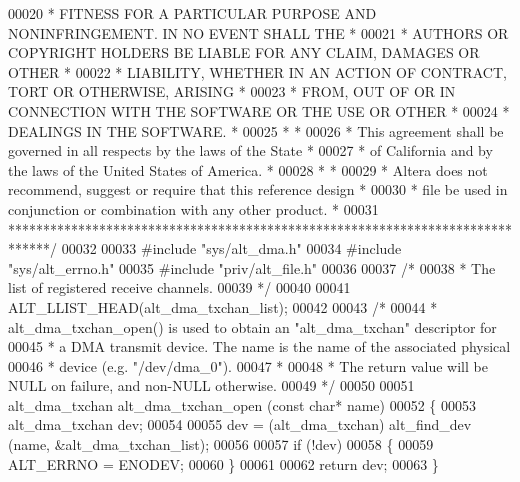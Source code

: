 \begin{DoxyCode}
00020 \textcolor{comment}{* FITNESS FOR A PARTICULAR PURPOSE AND NONINFRINGEMENT. IN NO EVENT SHALL THE *}
00021 \textcolor{comment}{* AUTHORS OR COPYRIGHT HOLDERS BE LIABLE FOR ANY CLAIM, DAMAGES OR OTHER      *}
00022 \textcolor{comment}{* LIABILITY, WHETHER IN AN ACTION OF CONTRACT, TORT OR OTHERWISE, ARISING     *}
00023 \textcolor{comment}{* FROM, OUT OF OR IN CONNECTION WITH THE SOFTWARE OR THE USE OR OTHER         *}
00024 \textcolor{comment}{* DEALINGS IN THE SOFTWARE.                                                   *}
00025 \textcolor{comment}{*                                                                             *}
00026 \textcolor{comment}{* This agreement shall be governed in all respects by the laws of the State   *}
00027 \textcolor{comment}{* of California and by the laws of the United States of America.              *}
00028 \textcolor{comment}{*                                                                             *}
00029 \textcolor{comment}{* Altera does not recommend, suggest or require that this reference design    *}
00030 \textcolor{comment}{* file be used in conjunction or combination with any other product.          *}
00031 \textcolor{comment}{******************************************************************************/}
00032 
00033 \textcolor{preprocessor}{#include "sys/alt_dma.h"}
00034 \textcolor{preprocessor}{#include "sys/alt_errno.h"}
00035 \textcolor{preprocessor}{#include "priv/alt_file.h"}
00036 
00037 \textcolor{comment}{/*}
00038 \textcolor{comment}{ * The list of registered receive channels.}
00039 \textcolor{comment}{ */}
00040 
00041 ALT_LLIST_HEAD(alt\_dma\_txchan\_list);
00042 
00043 \textcolor{comment}{/*}
00044 \textcolor{comment}{ * alt\_dma\_txchan\_open() is used to obtain an "alt\_dma\_txchan" descriptor for}
00045 \textcolor{comment}{ * a DMA transmit device. The name is the name of the associated physical}
00046 \textcolor{comment}{ * device (e.g. "/dev/dma\_0").}
00047 \textcolor{comment}{ *}
00048 \textcolor{comment}{ * The return value will be NULL on failure, and non-NULL otherwise. }
00049 \textcolor{comment}{ */}
00050 
00051 alt_dma_txchan alt_dma_txchan_open (\textcolor{keyword}{const} \textcolor{keywordtype}{char}* name)
00052 \{
00053   alt_dma_txchan dev;
00054 
00055   dev = (alt_dma_txchan) alt_find_dev (name, &alt\_dma\_txchan\_list);
00056 
00057   \textcolor{keywordflow}{if} (!dev)
00058   \{
00059     ALT_ERRNO = ENODEV;
00060   \}
00061 
00062   \textcolor{keywordflow}{return} dev;
00063 \}
\end{DoxyCode}
